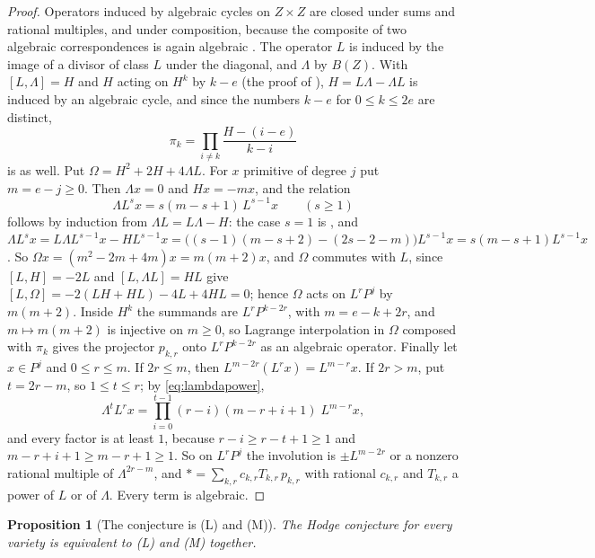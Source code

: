 \documentclass[11pt,reqno]{amsart}
\theoremstyle{plain}
\newtheorem{proposition}[theorem]{Proposition}
\theoremstyle{definition}
\theoremstyle{remark}
\begin{document}
\begin{proof}
Operators induced by algebraic cycles on $Z\times Z$ are closed under sums
and rational multiples, and under composition, because the composite of two
algebraic correspondences is again algebraic \cite{Kle68}. The operator $L$
is induced by the image of a divisor of class $L$ under the diagonal, and $\Lambda$ by $B(Z)$. With
$[L,\Lambda]=H$ and $H$ acting on $H^{k}$ by $k-e$ (the proof of
\cite[Lemma~10.7]{paperI}), $H=L\Lambda-\Lambda L$ is induced by an algebraic cycle,
and since the numbers $k-e$ for $0\le k\le 2e$ are distinct,
\[
  \pi_{k}=\prod_{i\ne k}\frac{H-(i-e)}{k-i}
\]
is as well. Put $\Omega=H^{2}+2H+4\Lambda L$. For $x$ primitive of degree
$j$ put $m=e-j\ge0$. Then $\Lambda x=0$ and $Hx=-mx$, and the relation
\begin{equation}\label{eq:lambdapower}
  \Lambda L^{s}x=s(m-s+1)\,L^{s-1}x\qquad(s\ge1)
\end{equation}
follows by induction from $\Lambda L=L\Lambda-H$: the case $s=1$ is
\cite[Lemma~10.7]{paperI}, and
$\Lambda L^{s}x=L\Lambda L^{s-1}x-HL^{s-1}x
=\bigl((s-1)(m-s+2)-(2s-2-m)\bigr)L^{s-1}x=s(m-s+1)L^{s-1}x$.
So $\Omega x=(m^{2}-2m+4m)x=m(m+2)x$, and $\Omega$ commutes with $L$, since
$[L,H]=-2L$ and $[L,\Lambda L]=HL$ give $[L,\Omega]=-2(LH+HL)-4L+4HL=0$;
hence $\Omega$ acts on $L^{r}P^{j}$ by $m(m+2)$. Inside $H^{k}$ the summands
are $L^{r}P^{k-2r}$, with $m=e-k+2r$, and $m\mapsto m(m+2)$ is injective on
$m\ge0$, so Lagrange interpolation in $\Omega$ composed with $\pi_{k}$ gives
the projector $p_{k,r}$ onto $L^{r}P^{k-2r}$ as an algebraic operator.
Finally let $x\in P^{j}$ and $0\le r\le m$. If $2r\le m$, then
$L^{m-2r}(L^{r}x)=L^{m-r}x$. If $2r>m$, put $t=2r-m$, so $1\le t\le r$;
by \eqref{eq:lambdapower},
\[
  \Lambda^{t}L^{r}x=\prod_{i=0}^{t-1}(r-i)(m-r+i+1)\;L^{m-r}x,
\]
and every factor is at least $1$, because $r-i\ge r-t+1\ge1$ and
$m-r+i+1\ge m-r+1\ge1$. So on $L^{r}P^{j}$ the involution is $\pm L^{m-2r}$
or a nonzero rational multiple of $\Lambda^{2r-m}$, and
${*}=\sum_{k,r}c_{k,r}T_{k,r}\,p_{k,r}$ with rational $c_{k,r}$ and
$T_{k,r}$ a power of $L$ or of $\Lambda$. Every term is algebraic.
\end{proof}

\begin{proposition}[The conjecture is (L) and (M)]\label{prop:lefmot}
The Hodge conjecture for every variety is equivalent to \textup{(L)} and
\textup{(M)} together.
\end{proposition}
\end{document}

